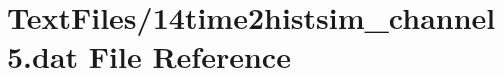 \hypertarget{14time2histsim__channel5_8dat}{}\section{Text\+Files/14time2histsim\+\_\+channel5.dat File Reference}
\label{14time2histsim__channel5_8dat}
